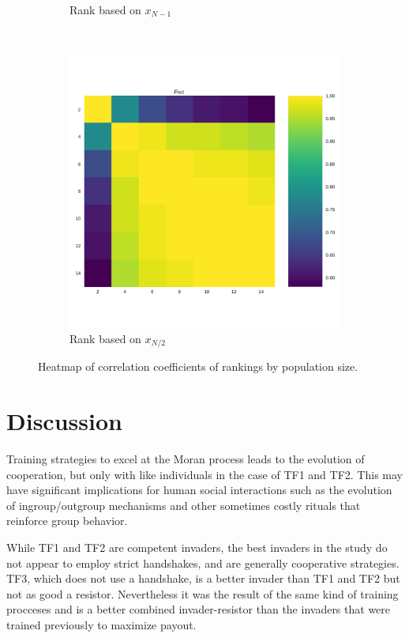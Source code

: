 \documentclass{article}
\begin{document}
\begin{figure}[!htbp]
\begin{subfigure}[t]{.3\textwidth}
        \caption{Rank based on \(x_{N - 1}\)}
    \end{subfigure}
    ~
    \begin{subfigure}[t]{.3\textwidth}
        \centering
        \includegraphics[width=.9\textwidth]{./img/correlation_heatmap_coexist.pdf}
        \caption{Rank based on \(x_{N/2}\)}
    \end{subfigure}
    \caption{Heatmap of correlation coefficients of rankings by population size.}
    \label{fig:correlation_coefficients}
\end{figure}

\section{Discussion}

Training strategies to excel
at the Moran process leads to the evolution of cooperation, but only with like
individuals in the case of TF1 and TF2. This may have significant implications
for human social interactions such as the evolution of ingroup/outgroup mechanisms
and other sometimes costly rituals that reinforce group behavior.

While TF1 and TF2 are competent invaders, the best invaders
in the study do not appear to employ strict handshakes, and are generally
cooperative strategies. TF3, which does not use a handshake, is a better invader
than TF1 and TF2 but not as good a resistor. Nevertheless it was the result
of the same kind of training procceses and is a better combined invader-resistor
than the invaders that were trained previously to maximize payout.
\end{document}
